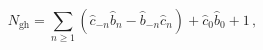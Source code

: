 \begin{equation}
N_{\mathrm{gh}}=\sum_{n\geq 1}(\hat{c}_{-n}\hat{b}_{n}-\hat{b}_{-n}\hat{c}%
_{n})+\hat{c}_{0}\hat{b}_{0}+1\,,
\end{equation}


